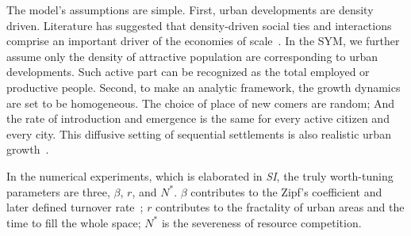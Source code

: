 \documentclass[reprint,unsortedaddress,amsmath,amssymb,aps,prl,showkeys]{revtex4-2}
\begin{document}
The model's assumptions are simple. First, urban developments are density driven. Literature has suggested that density-driven social ties and interactions comprise an important driver of the economies of scale~\cite{pan2013urban, girardin2009quantifying, batty1992form}. In the SYM, we further assume only the density of attractive population are corresponding to urban developments. Such active part can be recognized as the total employed or productive people. Second, to make an analytic framework, the growth dynamics are set to be homogeneous. The choice of place of new comers are random; And the rate of introduction and emergence is the same for every active citizen and every city. This diffusive setting of sequential settlements is also realistic urban growth~\cite{RevModPhys.87.925}. 

In the numerical experiments, which is elaborated in \textit{SI}, the truly worth-tuning parameters are three, $\beta$, $r$, and $N^*$. $\beta$ contributes to the Zipf's coefficient and later defined turnover rate~\cite{rooney2006structural}; $r$ contributes to the fractality of urban areas and the time to fill the whole space; $N^*$ is the severeness of resource competition. %
\end{document}
